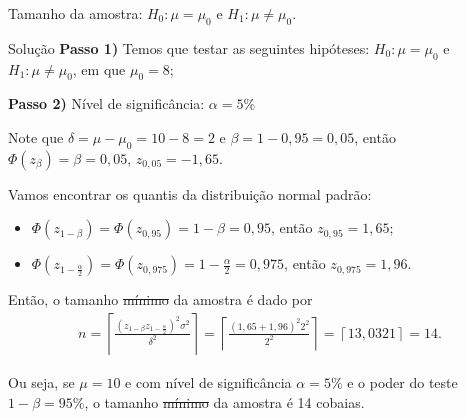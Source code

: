 \documentclass[8pt]{beamer}
\begin{document}
\begin{frame}{Tamanho da amostra: $H_0:\mu = \mu_0$ e $H_1: \mu \neq \mu_0$.}

\normalsize

\begin{block}{Solução}
	\textbf{Passo 1)} Temos que testar as seguintes hipóteses: $H_0: \mu = \mu_0$  e $H_1: \mu \neq \mu_0$, em que $\mu_0 = 8$;
	\vfill
	
	\textbf{Passo 2)} Nível de significância: $\alpha = 5\%$
	
	Note que $\delta = \mu - \mu_0 = 10 - 8 =2$ e $\beta = 1 - 0,95=0,05$, então $\Phi\left( z_\beta \right) = \beta = 0,05$, $z_{0,05} = -1,65$.
	
	Vamos encontrar os quantis da distribuição normal padrão:
	\begin{itemize}
		\item $\Phi\left( z_{1-\beta} \right) = \Phi\left( z_{0,95} \right) = 1-\beta = 0,95$, então $z_{0,95} = 1,65$;
		\item $\Phi\left( z_{1-\frac{\alpha}{2}} \right) = \Phi\left( z_{0,975} \right) = 1-\frac{\alpha}{2} = 0,975$, então $z_{0,975} = 1,96$.
	\end{itemize}
	\vfill
	
	 Então, o tamanho \sout{mínimo} da amostra é dado por
	\begin{align*}
		n = \left\lceil \frac{(z_{1-\beta}  z_{1-\frac{\alpha}{2}})^2 \sigma^2}{\delta^2} \right\rceil= \left\lceil \frac{(1,65 + 1,96)^2 2^2}{2^2} \right\rceil = \left\lceil 13,0321 \right\rceil  =14.
	\end{align*}
	
	Ou seja, se  $\mu=10$ e com nível de significância $\alpha=5\%$ e o poder do teste $1-\beta=95\%$, o tamanho  \sout{mínimo} da amostra  é 14 cobaias.
\end{block}

\normalsize

\end{frame}
\end{document}
